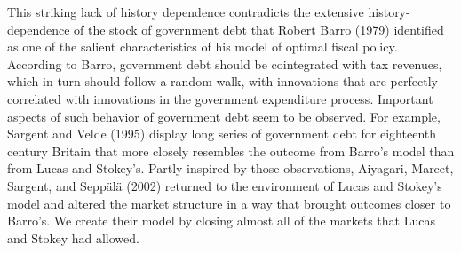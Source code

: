   This striking lack of history dependence
contradicts the extensive history-dependence of the stock of
government debt that Robert Barro (1979) identified as one of the
salient characteristics of his model  of optimal fiscal policy.
According to Barro, government debt should be cointegrated with
tax revenues, which in turn should follow a random walk, with
innovations that are perfectly correlated with innovations in the
government expenditure process. Important aspects of
such behavior of government debt
seem to be observed. For example, Sargent and Velde
(1995) display long series of government debt for eighteenth century
Britain that more closely resembles the outcome from Barro's model
than from Lucas and Stokey's. Partly inspired by those observations,
Aiyagari, Marcet, Sargent, and Sepp\"al\"a (2002) returned to the environment of Lucas and Stokey's
model and altered  the market structure in a way that brought
outcomes closer to Barro's.
We create their model by closing almost all of the markets that
Lucas and Stokey had allowed.
   




